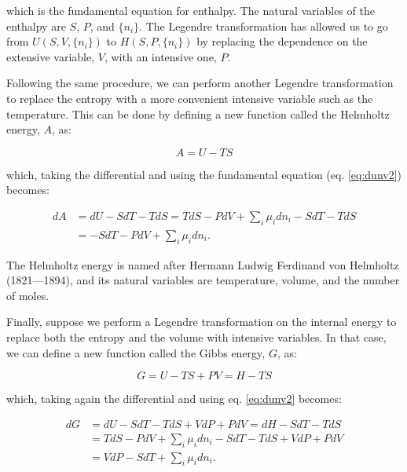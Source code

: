 \documentclass[
  9pt,
]{extbook}
\theoremstyle{definition}
\theoremstyle{definition}
\theoremstyle{definition}
\theoremstyle{definition}
\theoremstyle{remark}
\begin{document}
which is the fundamental equation for enthalpy. The natural variables of the enthalpy are \(S\), \(P\), and \(\{n_i\}\). The Legendre transformation has allowed us to go from \(U(S,V,\{n_i\})\) to \(H(S,P,\{n_i\})\) by replacing the dependence on the extensive variable, \(V\), with an intensive one, \(P\).

Following the same procedure, we can perform another Legendre transformation to replace the entropy with a more convenient intensive variable such as the temperature. This can be done by defining a new function called the Helmholtz energy, \(A\), as:

\begin{equation}
A = U -TS
\label{eq:dadef1}
\end{equation}

which, taking the differential and using the fundamental equation (eq. \eqref{eq:dunv2}) becomes:

\begin{equation}
\begin{aligned}
dA &= dU -SdT -TdS = TdS - PdV +\sum_i \mu_i dn_i -SdT -TdS  \\
   &= -SdT -PdV +\sum_i \mu_i dn_i.
\end{aligned}
\label{eq:dadef2}
\end{equation}

The Helmholtz energy is named after Hermann Ludwig Ferdinand von Helmholtz (1821---1894), and its natural variables are temperature, volume, and the number of moles.

Finally, suppose we perform a Legendre transformation on the internal energy to replace both the entropy and the volume with intensive variables. In that case, we can define a new function called the Gibbs energy, \(G\), as:

\begin{equation}
G = U -TS +PV = H-TS
\label{eq:dgdef1}
\end{equation}

which, taking again the differential and using eq. \eqref{eq:dunv2} becomes:

\begin{equation}
\begin{aligned}
dG &= dU -SdT -TdS +VdP +PdV = dH -SdT -TdS\\
   &= TdS - PdV +\sum_i\mu_i dn_i -SdT -TdS +VdP +PdV \\
   &= VdP -SdT +\sum_i\mu_i dn_i.
\end{aligned}
\label{eq:dgdef2}
\end{equation}
\end{document}
